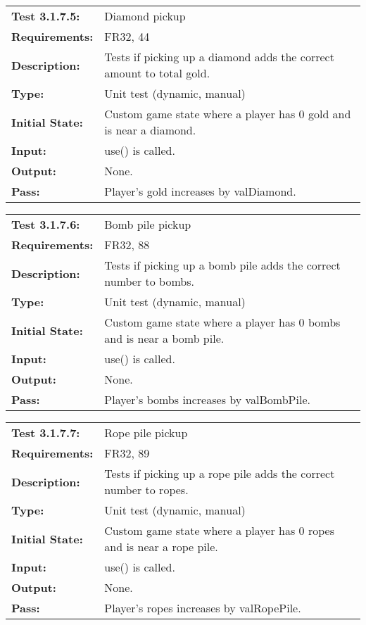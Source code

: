 \documentclass[12pt, titlepage]{article}
\begin{document}
\textcolor{red}{
\begin{tabular}{|l|p{10cm}|}
    \hline
    \bf{Test} 3.1.7.5: & Diamond pickup \\
    \bf{Requirements}: & FR32, 44 \\
    \bf{Description}: & Tests if picking up a diamond adds the correct amount to total gold. \\
    \bf{Type}: & Unit test (dynamic, manual) \\
    \bf{Initial State}: & Custom game state where a player has $0$ gold and is near a diamond. \\
    \bf{Input}: & use() is called. \\
    \bf{Output}: & None. \\
    \bf{Pass}: & Player's gold increases by valDiamond. \\
    \hline
\end{tabular}
}

\textcolor{red}{
\begin{tabular}{|l|p{10cm}|}
    \hline
    \bf{Test} 3.1.7.6: & Bomb pile pickup \\
    \bf{Requirements}: & FR32, 88 \\
    \bf{Description}: & Tests if picking up a bomb pile adds the correct number to bombs. \\
    \bf{Type}: & Unit test (dynamic, manual) \\
    \bf{Initial State}: & Custom game state where a player has $0$ bombs and is near a bomb pile. \\
    \bf{Input}: & use() is called. \\
    \bf{Output}: & None. \\
    \bf{Pass}: & Player's bombs increases by valBombPile. \\
    \hline
\end{tabular}
}

\textcolor{red}{
\begin{tabular}{|l|p{10cm}|}
    \hline
    \bf{Test} 3.1.7.7: & Rope pile pickup \\
    \bf{Requirements}: & FR32, 89 \\
    \bf{Description}: & Tests if picking up a rope pile adds the correct number to ropes. \\
    \bf{Type}: & Unit test (dynamic, manual) \\
    \bf{Initial State}: & Custom game state where a player has $0$ ropes and is near a rope pile. \\
    \bf{Input}: & use() is called. \\
    \bf{Output}: & None. \\
    \bf{Pass}: & Player's ropes increases by valRopePile. \\
    \hline
\end{tabular}
}
\end{document}
